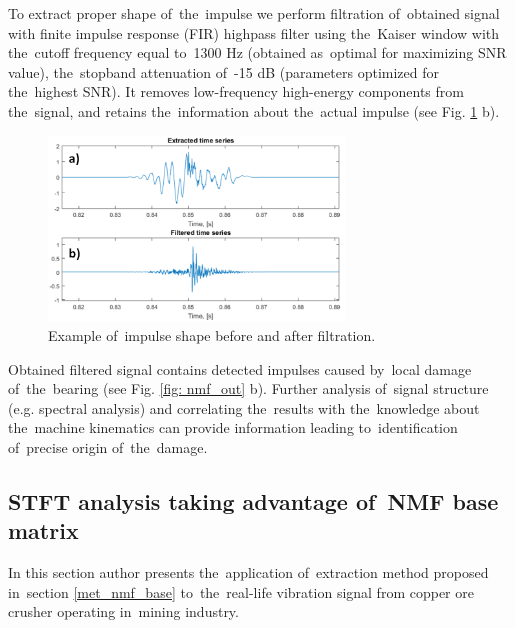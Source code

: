 To extract proper shape of~the~impulse we perform filtration of~obtained signal with finite impulse response (FIR) highpass filter using the~Kaiser window with the~cutoff frequency equal to~1300 Hz (obtained as~optimal for maximizing SNR value), the~stopband attenuation of~-15 dB (parameters optimized for the~highest SNR). It removes low-frequency high-energy components from the~signal, and retains the~information about the~actual impulse (see Fig. \ref{fig: nmf_imp} b).

\begin{figure}[ht!]
\centering
\includegraphics[width = 0.7\textwidth]{wykresy/nmf_imp.png}
\caption{Example of~impulse shape before and after filtration.}
\label{fig: nmf_imp}
\end{figure}

Obtained filtered signal contains detected impulses caused by~local damage of~the~bearing (see Fig. \ref{fig: nmf_out} b). Further analysis of~signal structure (e.g. spectral analysis) and correlating the~results with the~knowledge about the~machine kinematics can provide information leading to~identification of~precise origin of~the~damage.

\subsection{STFT analysis taking advantage of~NMF base matrix}\label{result_base}

In this section author presents the~application of~extraction method proposed in~section \ref{met_nmf_base} to~the~real-life vibration signal from copper ore crusher operating in~mining industry. 




